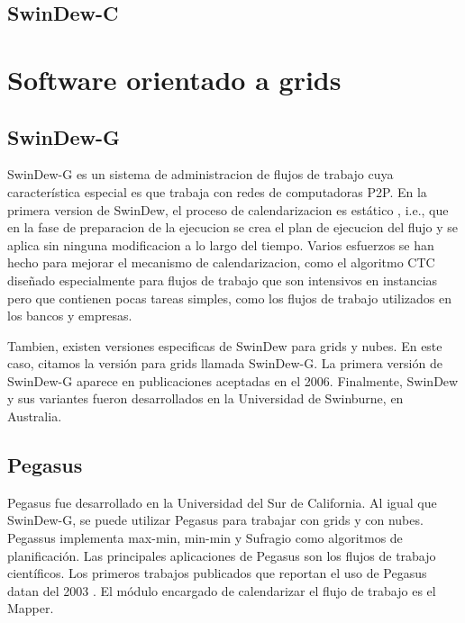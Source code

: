 \subsection{SwinDew-C}


\section{Software orientado a grids}

\subsection{SwinDew-G}


SwinDew-G \cite{yang2007peer} es un sistema de administracion de flujos de trabajo cuya característica especial es que trabaja con redes de computadoras P2P. En la primera version de SwinDew, el proceso de calendarizacion es estático \cite{yang2007peer}, i.e., que en la fase de preparacion de la ejecucion se crea el plan de ejecucion del flujo y se aplica sin ninguna modificacion a lo largo del tiempo. Varios esfuerzos se han hecho para mejorar el mecanismo de calendarizacion, como el algoritmo CTC \cite{liu2010compromised} diseñado especialmente para flujos de trabajo que son intensivos en instancias pero que contienen pocas tareas simples, como los flujos de trabajo utilizados en los bancos y empresas.

Tambien, existen versiones especificas de SwinDew para grids y nubes. En este caso, citamos la versión para grids llamada SwinDew-G. La primera versión de SwinDew-G aparece en publicaciones aceptadas en el 2006. Finalmente, SwinDew y sus variantes fueron desarrollados en la Universidad de Swinburne, en Australia.

\subsection{Pegasus}

Pegasus \cite{deelman2005pegasus} fue desarrollado en la Universidad del Sur de California. Al igual que SwinDew-G, se puede utilizar Pegasus para trabajar con grids y con nubes. Pegassus implementa max-min, min-min y Sufragio como algoritmos de planificación. Las principales aplicaciones de Pegasus son los flujos de trabajo científicos. Los primeros trabajos publicados que reportan el uso de Pegasus datan del 2003 \cite{pegasus2014publications}. El módulo encargado de calendarizar el flujo de trabajo es el Mapper.

